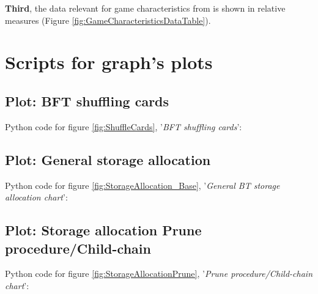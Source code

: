 \noindent \textbf{Third}, the data relevant for game characteristics from \cite[18]{LimelightNetworks.2020} is shown in relative measures (Figure \ref{fig:GameCharacteristicsDataTable}).

\begin{figure}
\end{figure}



\section{Scripts for graph's plots}
\label{script:GraphPlots}

\subsection{Plot: BFT shuffling cards}
\label{script:BFTshufflingCards}
Python code for figure \ref{fig:ShuffleCards}, '\textit{BFT shuffling cards}':
\pagebreak

\subsection{Plot: General storage allocation}
\label{script:GeneralStorageAllocation}
Python code for figure \ref{fig:StorageAllocation_Base}, '\textit{General \gls{BT} storage allocation chart}':
\pagebreak

\subsection{Plot: Storage allocation Prune procedure/Child-chain}
\label{script:StorageAllocationPPSC}
Python code for figure \ref{fig:StorageAllocationPrune}, '\textit{Prune procedure/Child-chain chart}':
\pagebreak

